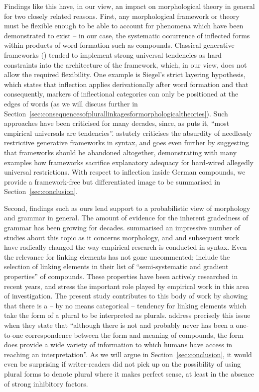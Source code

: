Findings like this have, in our view, an impact on morphological theory in general for two closely related reasons.
First, any morphological framework or theory must be flexible enough to be able to account for phenomena which have been demonstrated to exist -- in our case, the systematic occurrence of inflected forms within products of word-formation such as compounds.
Classical generative frameworks (\egg \citealt{Siegel1979,Mohanan1986,Anderson1992,Pinker1999}) tended to implement strong universal tendencies as hard constraints into the architecture of the framework, which, in our view, does not allow the required flexibility.
One example is Siegel's strict layering hypothesis, which states that inflection applies derivationally after word formation and that consequently, markers of inflectional categories can only be positioned at the edges of words (as we will discuss further in Section~\ref{sec:consequencesofplurallinkagesformorphologicaltheories}).
Such approaches have been criticised for many decades, since, as \textcite[391]{Haspelmath2010} puts it, ``most empirical universals are tendencies''.
\textcite{Pollard1996} astutely criticises the absurdity of needlessly restrictive generative frameworks in syntax, and \textcite{Haspelmath2010} goes even further by suggesting that frameworks should be abandoned altogether, demonstrating with many examples how frameworks sacrifice explanatory adequacy for hard-wired allegedly universal restrictions.
With respect to inflection inside German compounds, we provide a framework-free but differentiated image to be summarised in Section~\ref{sec:conclusion}.

Second, findings such as ours lend support to a probabilistic view of morphology and grammar in general.
The amount of evidence for the inherent gradedness of grammar has been growing for decades.
\textcite{HayBaayen2005} summarised an impressive number of studies about this topic as it concerns morphology, and \textcite{Bresnan2007} and subsequent work have radically changed the way empirical research is conducted in syntax.
Even the relevance for linking elements has not gone uncommented; \textcite[105]{ArndtlappeEa2016} include the selection of linking elements in their list of ``semi-systematic and gradient properties'' of compounds.
These properties have been actively researched in recent years, and \textcite{ArndtlappeEa2016} stress the important role played by empirical work in this area of investigation.
The present study contributes to this body of work by showing that there is a -- by no means categorical -- tendency for linking elements which take the form of a plural to be interpreted as plurals.
\textcite[107]{ArndtlappeEa2016} address precisely this issue when they state that ``although there is not and probably never has been a one-to-one correspondence between the form and meaning of compounds, the form does provide a wide variety of information to which humans have access in reaching an interpretation''.
As we will argue in Section~\ref{sec:conclusion}, it would even be surprising if writer-readers did not pick up on the possibility of using plural forms to denote plural where it makes perfect sense, at least in the absence of strong inhibitory factors.

